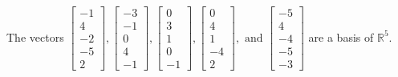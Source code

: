 \begin{exercise}
\begin{exerciseStatement}
  \end{exerciseStatement}
  \begin{exerciseAnswer}
   The vectors \(\left[\begin{array}{r}
-1 \\
4 \\
-2 \\
-5 \\
2
\end{array}\right] , \left[\begin{array}{r}
-3 \\
-1 \\
0 \\
4 \\
-1
\end{array}\right] , \left[\begin{array}{r}
0 \\
3 \\
1 \\
0 \\
-1
\end{array}\right] , \left[\begin{array}{r}
0 \\
4 \\
1 \\
-4 \\
2
\end{array}\right] , \text{ and } \left[\begin{array}{r}
-5 \\
4 \\
-4 \\
-5 \\
-3
\end{array}\right]\) 
  	 are  a basis of \(\mathbb{R}^5\).
  


  \end{exerciseAnswer}
\end{exercise}